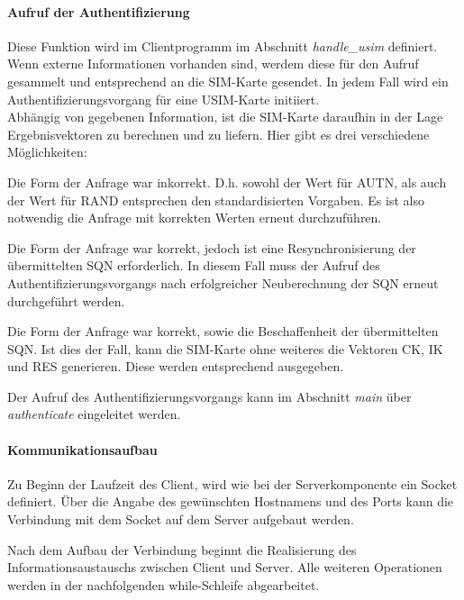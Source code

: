         \paragraph{Aufruf der Authentifizierung} Diese Funktion wird im Clientprogramm im Abschnitt
        \textit{handle\_usim} definiert. Wenn externe Informationen vorhanden sind, werdem diese für den Aufruf
        gesammelt und entsprechend an die SIM-Karte gesendet. In jedem Fall wird ein Authentifizierungsvorgang
        für eine USIM-Karte initiiert. \\
        Abhängig von gegebenen Information, ist die SIM-Karte daraufhin in der Lage Ergebnisvektoren
        zu berechnen und zu liefern. Hier gibt es drei verschiedene Möglichkeiten:
            \begin{addmargin}[1em]{2em}
            Die Form der Anfrage war inkorrekt. D.h. sowohl der Wert für AUTN, als auch der Wert für RAND entsprechen
            den standardisierten Vorgaben. Es ist also notwendig die Anfrage mit korrekten Werten erneut
            durchzuführen.

            Die Form der Anfrage war korrekt, jedoch ist eine Resynchronisierung der übermittelten SQN erforderlich.
            In diesem Fall muss der Aufruf des Authentifizierungsvorgangs nach erfolgreicher Neuberechnung der SQN
            erneut durchgeführt werden.

            Die Form der Anfrage war korrekt, sowie die Beschaffenheit der übermittel\-ten SQN. Ist dies der Fall,
            kann die SIM-Karte ohne weiteres die Vektoren CK, IK und RES generieren. Diese werden entsprechend
            ausgegeben.
            \end{addmargin}
        Der Aufruf des Authentifizierungsvorgangs kann im Abschnitt \textit{main} über \textit{authenticate}
        eingeleitet werden.

        \paragraph{Kommunikationsaufbau} Zu Beginn der Laufzeit des Client, wird wie bei der 
        Serverkomponente ein Socket definiert. Über die Angabe des gewünschten Hostnamens und des Ports
        kann die Verbindung mit dem Socket auf dem Server aufgebaut werden.

        Nach dem Aufbau der Verbindung beginnt die Realisierung des Informationsaustauschs zwischen
        Client und Server.
        Alle weiteren Operationen werden in der nachfolgenden while-Schleife abgearbeitet.

